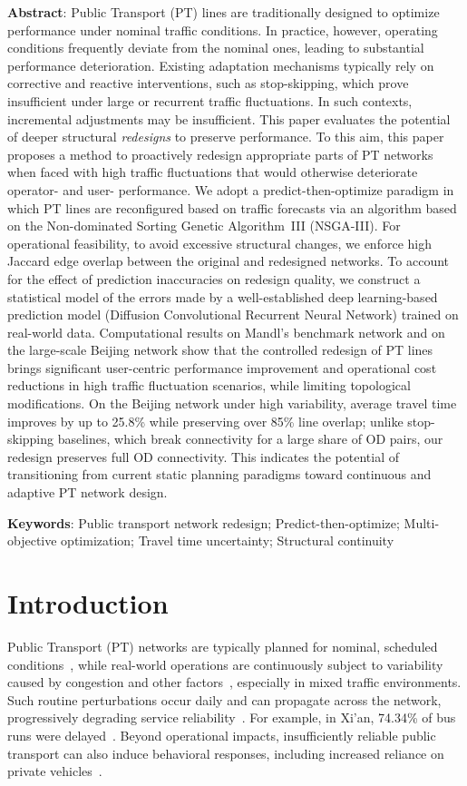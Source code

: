 \documentclass[11pt,a4paper]{article} %
\begin{document}
\textbf{Abstract}: Public Transport (PT) lines are traditionally designed to optimize performance under nominal traffic conditions. In practice, however, operating conditions frequently deviate from the nominal ones, leading to substantial performance deterioration. Existing adaptation mechanisms typically rely on corrective and reactive interventions, such as stop-skipping, which prove insufficient under large or recurrent traffic fluctuations. In such contexts, incremental adjustments may be insufficient. This paper evaluates the potential of deeper structural \emph{redesigns} to preserve performance. To this aim, this paper proposes a method to proactively redesign appropriate parts of PT networks when faced with high traffic fluctuations that would otherwise deteriorate operator- and user- performance. We adopt a predict-then-optimize paradigm in which PT lines are reconfigured based on traffic forecasts via an algorithm based on the Non-dominated Sorting Genetic Algorithm~III (NSGA-III). For operational feasibility, to avoid excessive structural changes, we enforce high Jaccard edge overlap between the original and redesigned networks. To account for the effect of prediction inaccuracies on redesign quality, we construct a statistical model of the errors made by a well-established deep learning-based prediction model (Diffusion Convolutional Recurrent Neural Network) trained on real-world data. Computational results on Mandl's benchmark network and on the large-scale Beijing network show that the controlled redesign of PT lines brings significant user-centric performance improvement and operational cost reductions in high traffic fluctuation scenarios, while limiting topological modifications. On the Beijing network under high variability, average travel time improves by up to 25.8\% while preserving over 85\% line overlap; unlike stop-skipping baselines, which break connectivity for a large share of OD pairs, our redesign preserves full OD connectivity. This indicates the potential of transitioning from current static planning paradigms toward continuous and adaptive PT network design.

\textbf{Keywords}: Public transport network redesign; Predict-then-optimize; Multi-objective optimization; Travel time uncertainty; Structural continuity

\section{Introduction}
Public Transport (PT) networks are typically planned for nominal, scheduled conditions~\citep{ibarra2015planning}, while real-world operations are continuously subject to variability caused by congestion and other factors~\citep{buchel2020review,danaher2020minutes}, especially in mixed traffic environments. Such routine perturbations occur daily and can propagate across the network, progressively degrading service reliability~\citep{marra2020delay}. For example, in Xi’an, 74.34\% of bus runs were delayed~\citep{zhang2022travel}. Beyond operational impacts, insufficiently reliable public transport can also induce behavioral responses, including increased reliance on private vehicles~\citep{rodier2025evaluation}.
\end{document}
